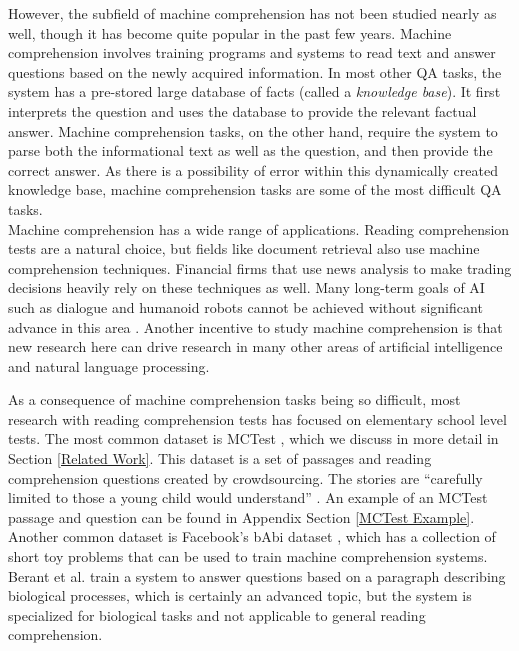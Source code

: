 \documentclass[pageno]{final_paper}
\begin{document}
However, the subfield of machine comprehension has not been studied nearly as
well, though it has become quite popular in the past few years. Machine
comprehension involves training programs and systems to read text and answer
questions based on the newly acquired information. In most other QA tasks, the
system has a pre-stored large database of facts (called a \textit{knowledge
base}). It first interprets the question and uses the database to provide the
relevant factual answer. Machine comprehension tasks, on the other hand, require
the system to parse both the informational text as well as the question, and
then provide the correct answer. As there is a possibility of error within this
dynamically created knowledge base, machine comprehension tasks are some of the
most difficult QA tasks. \\

Machine comprehension has a wide range of applications. Reading comprehension
tests are a natural choice, but fields like document retrieval also use machine
comprehension techniques. Financial firms that use news analysis to make trading
decisions heavily rely on these techniques as well. Many long-term goals of AI
such as dialogue and humanoid robots cannot be achieved without significant
advance in this area \cite{Weston2015}. Another incentive to study machine
comprehension is that new research here can drive research in many other areas
of artificial intelligence and natural language processing.

As a consequence of machine comprehension tasks being so difficult, most
research with reading comprehension tests has focused on elementary school level
tests. The most common dataset is MCTest \cite{Richardson2013}, which we discuss
in more detail in Section \ref{Related Work}. This dataset is a set of passages
and reading comprehension questions created by crowdsourcing. The stories are
``carefully limited to those a young child would understand''
\cite{Richardson2013}. An example of an MCTest passage and question can be found
in Appendix Section \ref{MCTest Example}. Another common dataset is Facebook's
bAbi dataset \cite{Weston2015}, which has a collection of short toy problems
that can be used to train machine comprehension systems. Berant et al.
\cite{Berant2014} train a system to answer questions based on a paragraph
describing biological processes, which is certainly an advanced topic, but the
system is specialized for biological tasks and not applicable to general reading
comprehension.
\end{document}
